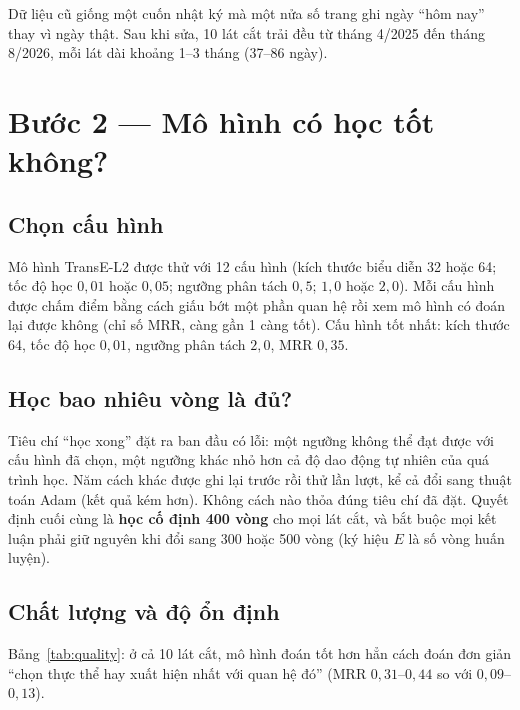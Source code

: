 \begin{table}[htbp]
\centering
\caption{Mười lát cắt thời gian sau khi sửa dữ liệu.}
\label{tab:snapshots_v33}

\end{table}

\begin{remark}
Dữ liệu cũ giống một cuốn nhật ký mà một nửa số trang ghi ngày ``hôm nay'' thay vì ngày thật. Sau khi sửa, 10 lát cắt trải đều từ tháng 4/2025 đến tháng 8/2026, mỗi lát dài khoảng 1--3 tháng (37--86 ngày).
\end{remark}

\section{Bước 2 --- Mô hình có học tốt không?}
\label{sec:backbone}

\subsection{Chọn cấu hình}
Mô hình TransE-L2 được thử với 12 cấu hình (kích thước biểu diễn 32 hoặc 64; tốc độ học $0{,}01$ hoặc $0{,}05$; ngưỡng phân tách $0{,}5$; $1{,}0$ hoặc $2{,}0$). Mỗi cấu hình được chấm điểm bằng cách giấu bớt một phần quan hệ rồi xem mô hình có đoán lại được không (chỉ số MRR, càng gần 1 càng tốt). Cấu hình tốt nhất: kích thước 64, tốc độ học $0{,}01$, ngưỡng phân tách $2{,}0$, MRR $0{,}35$.

\subsection{Học bao nhiêu vòng là đủ?}
Tiêu chí ``học xong'' đặt ra ban đầu có lỗi: một ngưỡng không thể đạt được với cấu hình đã chọn, một ngưỡng khác nhỏ hơn cả độ dao động tự nhiên của quá trình học. Năm cách khác được ghi lại trước rồi thử lần lượt, kể cả đổi sang thuật toán Adam (kết quả kém hơn). Không cách nào thỏa đúng tiêu chí đã đặt. Quyết định cuối cùng là \textbf{học cố định 400 vòng} cho mọi lát cắt, và bắt buộc mọi kết luận phải giữ nguyên khi đổi sang 300 hoặc 500 vòng (ký hiệu $E$ là số vòng huấn luyện).

\subsection{Chất lượng và độ ổn định}
Bảng~\ref{tab:quality}: ở cả 10 lát cắt, mô hình đoán tốt hơn hẳn cách đoán đơn giản ``chọn thực thể hay xuất hiện nhất với quan hệ đó'' (MRR $0{,}31$--$0{,}44$ so với $0{,}09$--$0{,}13$).

